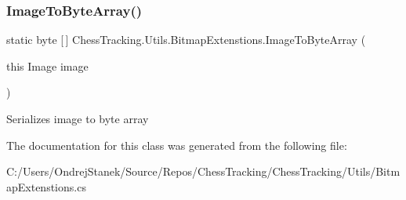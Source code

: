 \subsubsection{\texorpdfstring{ImageToByteArray()}{ImageToByteArray()}}
{\footnotesize\ttfamily static byte \mbox{[}$\,$\mbox{]} Chess\+Tracking.\+Utils.\+Bitmap\+Extenstions.\+Image\+To\+Byte\+Array (\begin{DoxyParamCaption}\item[{this Image}]{image }\end{DoxyParamCaption})\hspace{0.3cm}{\ttfamily [static]}}



Serializes image to byte array 



The documentation for this class was generated from the following file\+:\begin{DoxyCompactItemize}
\item 
C\+:/\+Users/\+Ondrej\+Stanek/\+Source/\+Repos/\+Chess\+Tracking/\+Chess\+Tracking/\+Utils/Bitmap\+Extenstions.\+cs\end{DoxyCompactItemize}
